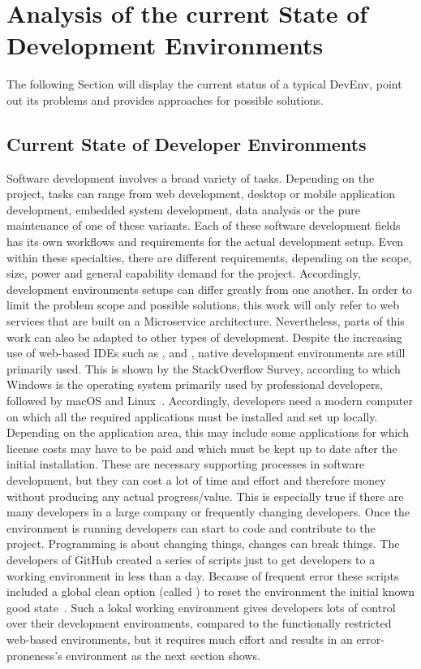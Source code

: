 \documentclass[12pt, a4paper]{article}
\begin{document}
\section{Analysis of the current State of Development Environments}\label{sec::problem}
The following Section will display the current status of a typical \ac{DevEnv}, point out its problems and provides approaches for possible solutions.

    \subsection{Current State of Developer Environments}
    Software development involves a broad variety of tasks. Depending on the project, tasks can range from web development, desktop or mobile application development, embedded system development, data analysis or the pure maintenance of one of these variants. Each of these software development fields has its own workflows and requirements for the actual development setup. Even within these specialties, there are different requirements, depending on the scope, size, power and general capability demand for the project. Accordingly, development environments setups can differ greatly from one another. In order to limit the problem scope and possible solutions, this work will only refer to web services that are built on a Microservice architecture. Nevertheless, parts of this work can also be adapted to other types of development.\newline
    Despite the increasing use of web-based \ac{IDE}s such as ,   and , native development environments are still primarily used. This is shown by the StackOverflow Survey, according to which Windows is the operating system primarily used by professional developers, followed by macOS and Linux~\cite{stackoverflow2021}. Accordingly, developers need a modern computer on which all the required applications must be installed and set up locally. Depending on the application area, this may include some applications for which license costs may have to be paid and which must be kept up to date after the initial installation. These are necessary supporting processes in software development, but they can cost a lot of time and effort and therefore money without producing any actual progress/value. This is especially true if there are many developers in a large company or frequently changing developers. Once the environment is running developers can start to code and contribute to the project. Programming is about changing things, changes can break things. The developers of GitHub created a series of scripts just to get developers to a working environment in less than a day. Because of frequent error these scripts included a global clean option (called ) to reset the environment the initial known good state~\cite{githubblogcodespace}.\newline
    Such a lokal working environment gives developers lots of control over their development environments, compared to the functionally restricted web-based environments, but it requires much effort and results in an error-proneness's environment as the next section shows.
\end{document}
